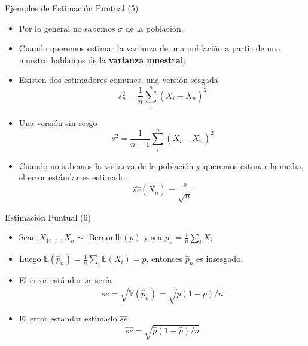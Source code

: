 \documentclass[handout]{beamer}
\begin{document}
\begin{frame}{Ejemplos de Estimación Puntual (5)}
\scriptsize{
\begin{itemize}
 \item Por lo general no sabemos $\sigma$ de la población.
 \item Cuando queremos estimar la varianza de una población a partir de una muestra hablamos de la  \textbf{varianza muestral}:
\item Existen dos estimadores comunes, una versión sesgada \begin{displaymath}
 s_{n}^{2}= \frac{1}{n} \sum_{i}^{n}(X_{i}-\overline{X_{n}})^2
\end{displaymath}

\item Una versión sin sesgo \begin{displaymath}
 s^{2}= \frac{1}{n-1} \sum_{i}^{n}(X_{i}-\overline{X_{n}})^2
\end{displaymath}

\item Cuando no sabemos la varianza de la población y queremos estimar la media, el error estándar es estimado: \begin{displaymath}                                                                                                                 
\hat{se}(\overline{X_{n}}) = \frac{s}{\sqrt{n}}                                                                                                                \end{displaymath}


\end{itemize}


} 
\end{frame}


\begin{frame}{Estimación Puntual (6)}
\scriptsize{
\begin{itemize}
 \item Sean $X_1, \dots, X_n \sim$ Bernoulli$(p)$ y sea $\hat{p}_{n}=\frac 1n \sum_{i}X_{i}$
 \item Luego $\mathbb{E}(\hat{p}_{n})= \frac 1n \sum_i \mathbb{E}(X_i)=p$, entonces $\hat{p}_n$ es insesgado.
 \item El error estándar $se$ sería
\begin{displaymath}
se = \sqrt{\mathbb{V}(\hat{p}_n)}= \sqrt{p(1-p)/n} 
\end{displaymath}
\item El error estándar estimado $\hat{se}$:
\begin{displaymath}
\hat{se} =\sqrt{\hat{p}(1-\hat p)/n} 
\end{displaymath}

\end{itemize}


} 
\end{frame}
\end{document}
